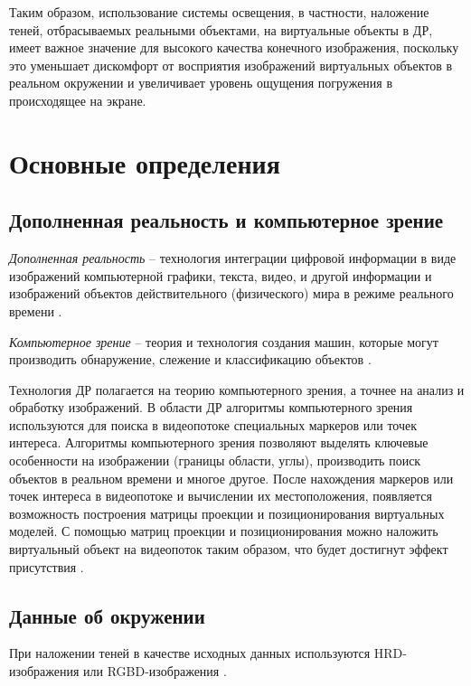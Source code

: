 Таким образом, использование системы освещения, в частности, наложение теней, отбрасываемых реальными объектами, на виртуальные объекты в ДР, имеет важное значение для высокого качества конечного изображения, поскольку это уменьшает дискомфорт от восприятия изображений виртуальных объектов в реальном окружении и увеличивает уровень ощущения погружения в происходящее на экране.

\section{Основные определения}

\subsection{Дополненная реальность и компьютерное зрение}

\textit{Дополненная реальность} -- технология интеграции цифровой информации в виде изображений компьютерной графики, текста, видео, и другой информации и изображений объектов действительного (физического) мира в режиме реального времени \cite{tech-ar}.

\textit{Компьютерное зрение} -- теория и технология создания машин, которые могут производить обнаружение, слежение и классификацию объектов \cite{comp_vision}. 

Технология ДР полагается на теорию компьютерного зрения, а точнее на анализ и обработку изображений. В области
ДР алгоритмы компьютерного зрения используются для поиска в видеопотоке специальных маркеров или точек интереса. Алгоритмы компьютерного зрения позволяют выделять ключевые особенности на изображении (границы области, углы), производить поиск объектов в реальном времени и многое другое. После нахождения маркеров или точек интереса в видеопотоке и вычислении их местоположения, появляется возможность построения матрицы проекции и позиционирования виртуальных моделей. С помощью матриц проекции и позиционирования можно наложить виртуальный объект на видеопоток таким образом, что будет достигнут эффект присутствия \cite{tech-ar}.

\subsection{Данные об окружении}

При наложении теней в качестве исходных данных используются HRD-изображения или RGBD-изображения \cite{debevec2008rendering, sns_tras}.

